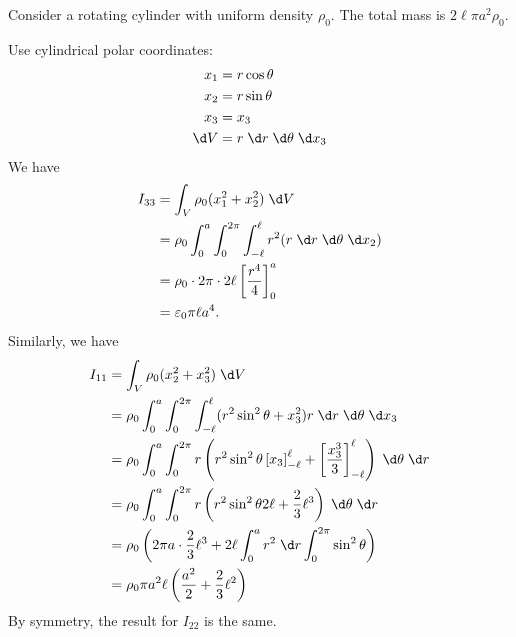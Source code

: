 \documentclass[a4paper]{article}
\begin{document}
\begin{eg}
  Consider a rotating cylinder with uniform density $\rho_0$. The total mass is $2\ell \pi a^2 \rho_0$.
  \begin{center}
  \end{center}
  Use cylindrical polar coordinates:
  \begin{align*}
    x_1 &= r\cos \theta\\
    x_2 &= r\sin \theta\\
    x_3 &= x_3\\
    \d V &= r\;\d r\;\d \theta \;\d x_3
  \end{align*}
  We have
  \begin{align*}
    I_{33} &= \int_V \rho_0 (x_1^2 + x_2^2)\;\d V\\
    &= \rho_0 \int_0^a \int_0^{2\pi} \int_{-\ell}^\ell r^2 (r\;\d r\;\d \theta \;\d x_2)\\
    &= \rho_0 \cdot 2\pi \cdot 2\ell \left[\frac{r^4}{4}\right]_0^a\\
    &= \varepsilon_0 \pi \ell a^4.
  \end{align*}
  Similarly, we have
  \begin{align*}
    I_{11} &= \int_V \rho_0 (x_2^2 + x_3^2)\;\d V\\
    &= \rho_0 \int_0^a \int_0^{2\pi}\int_{-\ell}^\ell (r^2 \sin^2 \theta + x_3^2) r\;\d r\;\d \theta \;\d x_3\\
    &= \rho_0 \int_0^a \int_0^{2\pi} r\left(r^2 \sin^2 \theta\left[x_3\right]_{-\ell}^\ell + \left[\frac{x_3^3}{3}\right]^{\ell}_{-\ell}\right)\;\d \theta\;\d r\\
    &= \rho_0 \int_0^a \int_0^{2\pi} r\left(r^2 \sin^2 \theta 2\ell + \frac{2}{3}\ell^3\right)\;\d \theta\;\d r\\
    &= \rho_0 \left(2\pi a \cdot \frac{2}{3}\ell^3 + 2\ell\int_0^a r^2 \;\d r\int_0^{2\pi}\sin^2 \theta\right)\\
    &= \rho_0 \pi a^2 \ell\left(\frac{a^2}{2} + \frac{2}{3}\ell^2\right)
  \end{align*}
  By symmetry, the result for $I_{22}$ is the same.


\end{eg}
\end{document}
